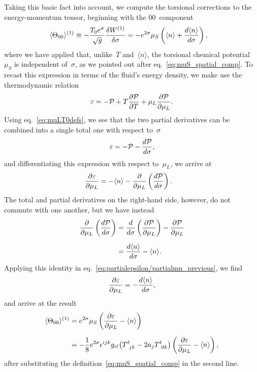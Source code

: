 \documentclass[11pt,a4paper]{article}
\begin{document}
Taking this basic fact into account, we compute the torsional corrections to the energy-momentum 
tensor, beginning with the $00$~component
\begin{align}
\langle\Theta_{00}\rangle^{(1)}&\equiv -{T_{0}e^{\sigma}\over \sqrt{g}}{\delta W^{(1)}\over \delta \sigma} 
=-e^{2\sigma}\mu_{S}\left(\langle n\rangle+{d\langle n\rangle\over d\sigma}
\right),
\label{eq:theta00_<n>}
\end{align}
where we have applied that, unlike~$T$
and~$\langle n\rangle$, the torsional chemical potential~$\mu_{S}$ 
is independent of~$\sigma$, as we pointed out after eq.~\eqref{eq:muS_spatial_comp}. 
To recast this expression in terms of the fluid's energy density, we make use the thermodynamic relation
\begin{align}
\varepsilon=-\mathcal{P}+T{\partial\mathcal{P}\over \partial T}
+\mu_{L}{\partial\mathcal{P}\over \partial\mu_{L}}.
\end{align}
Using eq.~\eqref{eq:muLT0defs}, we see that 
the two partial derivatives can be
combined into a single total one with respect to~$\sigma$
\begin{align}
\varepsilon=-\mathcal{P}-{d\mathcal{P}\over d\sigma},
\end{align}
and differentiating this expression with respect to~$\mu_{L}$, we arrive at
\begin{align}
{\partial\varepsilon\over\partial\mu_{L}}&=-\langle n\rangle-{\partial\over\partial\mu_{L}}
\left({d\mathcal{P}\over d\sigma}\right).
\label{eq:partialepsilon/partialmu_previous}
\end{align}
The total and partial derivatives on the
right-hand side, however, do not commute with one
another, but we have instead
\begin{align}
{\partial\over\partial\mu_{L}}
\left({d\mathcal{P}\over d\sigma}\right)
&={d\over d\sigma}\left({\partial\mathcal{P}\over\partial\mu_{L}}\right)
-{\partial\mathcal{P}\over\partial\mu_{L}}
\nonumber \\[0.2cm]
&={d\langle n\rangle\over d\sigma}-\langle n\rangle.
\end{align}
Applying this identity in eq.~\eqref{eq:partialepsilon/partialmu_previous}, we find
\begin{align}
{\partial\varepsilon\over\partial\mu_{L}}=-{d\langle n\rangle\over d\sigma},
\label{eq:depsilondmu=dndsigma}
\end{align}
and arrive at the result
\begin{align}
\langle\Theta_{00}\rangle^{(1)}&
=e^{2\sigma}\mu_{S}\left({\partial\varepsilon\over\partial\mu_{L}}-\langle n\rangle
\right) \nonumber \\[0.2cm]
&
=-{1\over 8}e^{2\sigma}
\epsilon^{ijk}g_{i\ell}\big(T^{\ell}_{\,\,\,jk}-2a_{j}T^{\ell}_{\,\,\,0k}\big)
\left({\partial\varepsilon\over\partial \mu_{L}}-\langle n\rangle\right),
\label{eq:<Theta00>}
\end{align}
after substituting the definition~\eqref{eq:muS_spatial_comp} in the second line.
\end{document}
